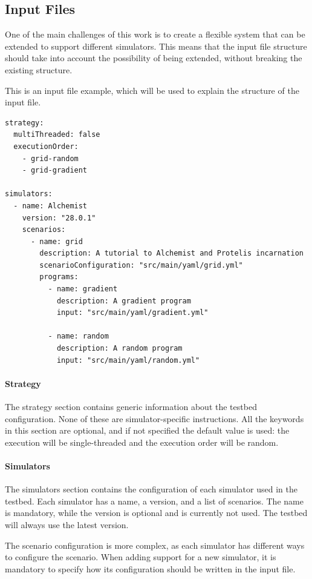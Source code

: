 \documentclass[12pt,a4paper,openright,twoside]{book}
\begin{document}
\subsection{Input Files}

One of the main challenges of this work is to create a flexible system that can be extended to support different simulators.
This means that the input file structure should take into account the possibility of being extended, without breaking the existing structure.

This is an input file example, which will be used to explain the structure of the input file.

\begin{lstlisting}[style=yaml]
strategy:
  multiThreaded: false
  executionOrder:
    - grid-random
    - grid-gradient

simulators:
  - name: Alchemist
    version: "28.0.1"
    scenarios:
      - name: grid
        description: A tutorial to Alchemist and Protelis incarnation
        scenarioConfiguration: "src/main/yaml/grid.yml"
        programs:
          - name: gradient
            description: A gradient program
            input: "src/main/yaml/gradient.yml"

          - name: random
            description: A random program
            input: "src/main/yaml/random.yml"
\end{lstlisting}

\paragraph*{Strategy} The strategy section contains generic information about the testbed configuration. None of these 
are simulator-specific instructions.
All the keywords in this section are optional, and if not specified the default value is used: the execution will be
single-threaded and the execution order will be random.

\paragraph*{Simulators} The simulators section contains the configuration of each simulator used in the testbed.
Each simulator has a name, a version, and a list of scenarios. The name is mandatory, while the version is optional 
and is currently not used. The testbed will always use the latest version.

The scenario configuration is more complex, as each simulator has different ways to configure the scenario.
When adding support for a new simulator, it is mandatory to specify how its configuration should be written in the input file.
\end{document}
